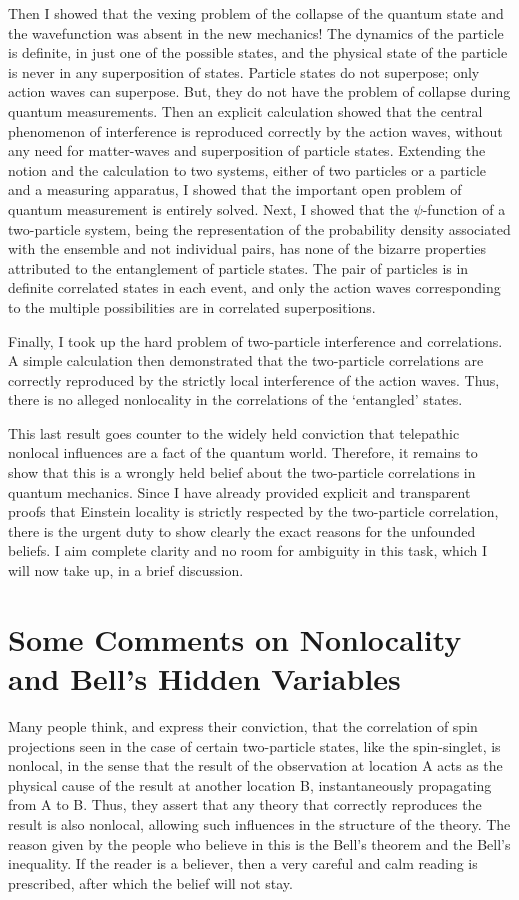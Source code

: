 Then I showed that the vexing problem of the collapse of the quantum state and the
wavefunction was absent in the new mechanics! The dynamics of the particle is definite, in
just one of the possible states, and the physical state of the particle is never in any 
superposition of states. Particle states do not superpose; only action waves can superpose. 
But, they do not have the problem of collapse during quantum measurements. Then an explicit
calculation showed that the central phenomenon of interference is reproduced correctly by
the action waves, without any need for matter-waves and superposition of particle states.
Extending the notion and the calculation to two systems, either of two particles or a 
particle and a measuring apparatus, I showed that the important open problem of quantum
measurement is entirely solved. Next, I showed that the $\psi$-function of a two-particle 
system, being the representation of the probability density associated with the ensemble and 
not individual pairs, has none of the bizarre properties attributed to the entanglement of
particle states. The pair of particles is in definite correlated states in each event, and only
the action waves corresponding to the multiple possibilities are in correlated superpositions.

Finally, I took up the hard problem of two-particle interference and correlations. A simple
calculation then demonstrated that the two-parti\-cle correlations are correctly reproduced by
the strictly local interference of the action waves. Thus, there is no alleged nonlocality in
the correlations of the `entangled' states.

This last result goes counter to the widely held conviction that telepathic nonlocal influences are a fact of the quantum world. Therefore, it remains to show that this is a wrongly held belief about the two-particle correlations in quantum mechanics. Since I have already provided explicit and transparent proofs that Einstein locality is strictly respected by the two-particle correlation, there is the urgent duty to show clearly the exact reasons for the unfounded beliefs. I aim complete clarity and no room for ambiguity in this task, which I will now take up, in a brief discussion.

\section{Some Comments on Nonlocality and Bell's Hidden Variables}\label{c14-sec9}

Many people think, and express their conviction, that the correlation of spin projections
seen in the case of certain two-particle states, like the spin-singlet, is nonlocal, in the sense
that the result of the observation at location A acts as the physical cause of the result at
another location B, instantaneously propagating from A to B. Thus, they assert that any
theory that correctly reproduces the result is also nonlocal, allowing such influences in the
structure of the theory. The reason given by the people who believe in this is the Bell's
theorem and the Bell's inequality. If the reader is a believer, then a very careful and calm
reading is prescribed, after which the belief will not stay.

